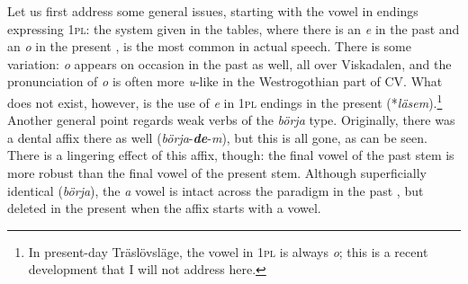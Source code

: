 \documentclass[output=paper,colorlinks,citecolor=brown,draft,draftmode]{langscibook}
\begin{document}
\begin{table}
\caption{\label{tab:petzell:2b}Viskadalian past tense inflection}
\end{table}

Let us first address some general issues, starting with the vowel in endings expressing 1\textsc{pl}: the system given in the tables, where there is an \textit{e} in the past  and an \textit{o} in the present , is the most common in actual speech. There is some variation: \textit{o} appears on occasion in the past  as well, all over Viskadalen, and the pronunciation of \textit{o} is often more \textit{u}-like in the Westrogothian part of CV. What does not exist, however, is the use of \textit{e} in 1\textsc{pl} endings in the present  (*\textit{läsem}).\footnote{In present-day Träslövsläge, the vowel in 1\textsc{pl} is always \textit{o}; this is a recent development that I will not address here.} Another general point regards weak verbs of the \textit{börja} type. Originally, there was a dental affix there as well (\textit{börja}-\textbf{\textit{de}}-\textit{m}), but this is all gone, as can be seen. There is a lingering effect of this affix, though: the final vowel of the past  stem is more robust than the final vowel of the present  stem. Although superficially identical (\textit{börja}), the \textit{a} vowel is intact across the paradigm in the past , but deleted in the present  when the  affix starts with a vowel.
\end{document}
